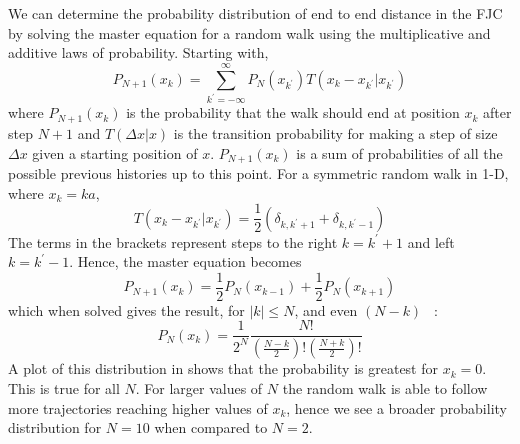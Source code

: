 We can determine the probability distribution of end to end distance in the FJC by solving the master equation for a random walk using the multiplicative and additive laws of probability. Starting with,
%
\begin{equation}
P_{N+1}\left(x_{k}\right)=\sum_{k^{'}=-\infty}^{\infty}P_{N}\left(x_{k^{'}}\right)T\left(x_{k}-x_{k^{'}}|x_{k^{'}}\right)\label{MasterEquation}
\end{equation}
%
where $P_{N+1}\left(x_{k}\right)$ is the probability that the walk should end at position $x_{k}$ after step $N+1$ and $T\left(\Delta x|x\right)$ is the transition probability for making a step of size $\Delta x$ given a starting position of $x$. $P_{N+1}\left(x_{k}\right)$ is a sum of probabilities of all the possible previous histories up to this point. For a symmetric random walk in 1-D, where $x_{k}=ka$,
%
\begin{equation}
T\left(x_{k}-x_{k^{'}}|x_{k^{'}}\right)=\frac{1}{2}\left(\delta_{k,k^{'}+1}+\delta_{k,k^{'}-1}\right)
\end{equation}
%
The terms in the brackets represent steps to the right $k=k^{'}+1$ and left $k=k^{'}-1$. Hence, the master equation becomes
%
\begin{equation}
P_{N+1}\left(x_{k}\right)=\frac{1}{2}P_{N}\left(x_{k-1}\right)+\frac{1}{2}P_{N}\left(x_{k+1}\right)
\end{equation}
%
which when solved gives the result, for $|k|\leq N$, and even $(N-k)$ ~\cite{Reif1965}:
%
\begin{equation}
P_{N}\left(x_{k}\right)=\frac{1}{2^{N}}\frac{N!}{\left(\frac{N-k}{2}\right)!\left(\frac{N+k}{2}\right)!}\label{SolvedMasterEquation}
\end{equation}
%
A plot of this distribution in  shows that the probability is greatest for $x_{k}=0$. This is true for all $N$. For larger values of $N$ the random walk is able to follow more trajectories reaching higher values of $x_{k}$, hence we see a broader probability distribution for $N=10$ when compared to $N=2$. 

